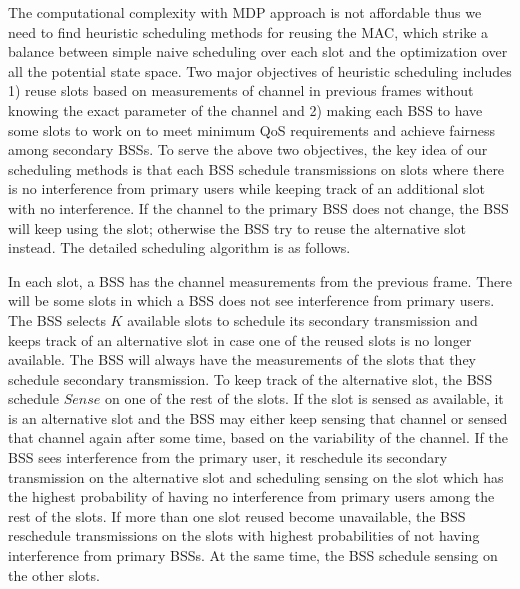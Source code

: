 \documentclass[10pt, conference, letterpaper]{IEEEtran}
\begin{document}
The computational complexity with MDP approach is not affordable thus we need to find heuristic scheduling methods for reusing the MAC, which strike a balance between simple naive scheduling over each slot and the optimization over all the potential state space. Two major objectives of heuristic scheduling includes 1) reuse slots based on measurements of channel in previous frames without knowing the exact parameter of the channel and 2) making each BSS to have some slots to work on to meet minimum QoS requirements and achieve fairness among secondary BSSs. To serve the above two objectives, the key idea of our scheduling methods is that each BSS schedule transmissions on slots where there is no interference from primary users while keeping track of an additional slot with no interference. If the channel to the primary BSS does not change, the BSS will keep using the slot; otherwise the BSS try to reuse the alternative slot instead. The detailed scheduling algorithm is as follows. 


In each slot, a BSS has the channel measurements from the previous frame. There will be some slots in which a BSS does not see interference from primary users. The BSS selects $K$ available slots to schedule its secondary transmission and keeps track of an alternative slot in case one of the reused slots is no longer available. The BSS will always have the measurements of the slots that they schedule secondary transmission. To keep track of the alternative slot, the BSS schedule $Sense$ on one of the rest of the slots. If the slot is sensed as available, it is an alternative slot and the BSS may either keep sensing that channel or sensed that channel again after some time, based on the variability of the channel. If the BSS sees interference from the primary user, it reschedule its secondary transmission on the alternative slot and scheduling sensing on the slot which has the highest probability of having no interference from primary users among the rest of the slots. If more than one slot reused become unavailable, the BSS reschedule transmissions on the slots with highest probabilities of not having interference from primary BSSs. At the same time, the BSS schedule sensing on the other slots.  
\end{document}

